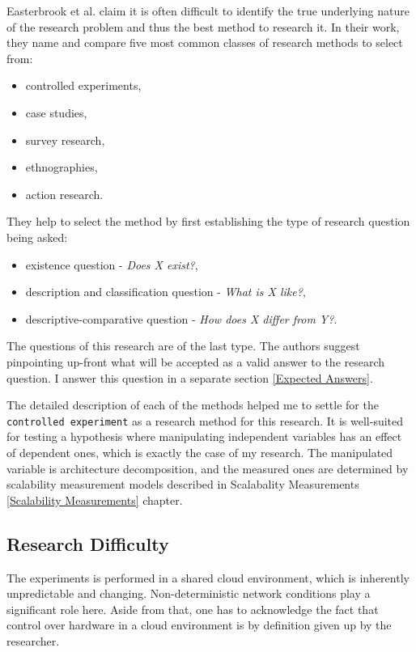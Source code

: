 \documentclass{uvamscse}
\begin{document}
Easterbrook et al. \cite{EastBr} claim it is often difficult to identify the true underlying nature of the research problem and thus the best method to research it. In their work, they name and compare five most common classes of research methods to select from:
\begin{itemize}
  \item controlled experiments,
  \item case studies,
  \item survey research,
  \item ethnographies,
  \item action research.
\end{itemize}
They help to select the method by first establishing the type of research question being asked:
\begin{itemize}
  \item existence question - \textit{Does X exist?},
  \item description and classification question - \textit{What is X like?},
  \item descriptive-comparative question - \textit{How does X differ from Y?}.
\end{itemize}
The questions of this research are of the last type. The authors \cite{EastBr} suggest pinpointing up-front what will be accepted as a valid answer to the research question. I answer this question in a separate section \ref{Expected Answers}.

The detailed description of each of the methods helped me to settle for the \texttt{controlled experiment} as a research method for this research. It is well-suited for testing a hypothesis where manipulating independent variables has an effect of dependent ones, which is exactly the case of my research. The manipulated variable is architecture decomposition, and the measured ones are determined by scalability measurement models described in Scalabality Measurements \ref{Scalability Measurements} chapter.

\subsection{Research Difficulty}
The experiments is performed in a shared cloud environment, which is inherently unpredictable and changing. Non-deterministic network conditions play a significant role here. Aside from that, one has to acknowledge the fact that control over hardware in a cloud environment is by definition given up by the researcher.
\end{document}
